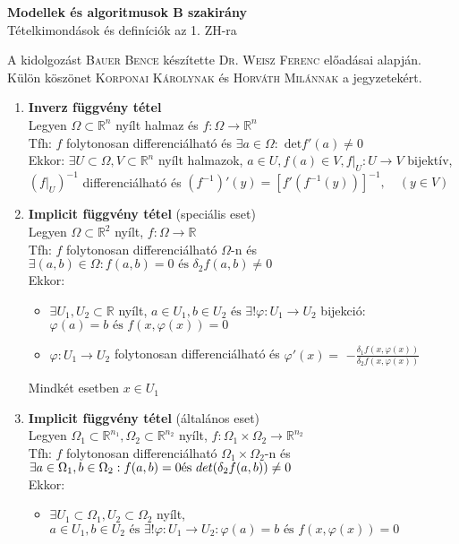 \documentclass{article}
\begin{document}
\renewcommand{\labelitemi}{\textbullet}
\def\R{\mathbb{R}}
\def\br{\\[0.1cm]}
\def\folytdifh{folytonosan differenciálható }
\begin{center}
	{\Large\textbf{Modellek és algoritmusok B szakirány}}\\[0.2cm]
	Tételkimondások és definíciók az 1. ZH-ra
\end{center}
{\small A kidolgozást \textsc{Bauer Bence} készítette \textsc{Dr. Weisz Ferenc} előadásai alapján.}\\
{\footnotesize Külön köszönet \textsc{Korponai Károlynak} és \textsc{Horváth Milánnak} a jegyzetekért.}

\begin{enumerate}
	\item\textbf{Inverz függvény tétel}\br
	Legyen $\Omega\subset\R^n$ nyílt halmaz és $f:\Omega\rightarrow\R^n$\br
	Tfh: $f$ \folytdifh és $\exists a\in\Omega:\text{ det}f'(a)\neq0$\br
	Ekkor: $\exists U\subset\Omega, V\subset\R^n$ nyílt halmazok, $a\in U, f(a)\in V,
	f|_U:U\rightarrow V$ bijektív,\br
	$(f|_U)^{-1}$ differenciálható és $(f^{-1})'(y)=[f'(f^{-1}(y))]^{-1},\quad (y\in V)$
	\item\textbf{Implicit függvény tétel} (speciális eset)\br
	Legyen $\Omega\subset\R^2$ nyílt, $f:\Omega\rightarrow\R$\br
	Tfh: $f$ folytonosan differenciálható $\Omega$-n és $\exists(a,b)\in\Omega:
	f(a,b)=0\text{ és }\delta_2f(a,b)\neq0$\br
	Ekkor:
	\begin{itemize}
		\item $\exists U_1, U_2\subset\R$ nyílt, $a\in U_1, b\in U_2\text{ és }\exists!\varphi:
		U_1\rightarrow U_2$ bijekció:$\varphi(a)=b\text{ és }f(x, \varphi(x))=0$
		\item $\varphi:U_1\rightarrow U_2$ \folytdifh és $\varphi'(x)=$
		\LARGE{$-\frac{\delta_1f(x, \varphi(x))}{\delta_2f(x, \varphi(x))}$}
	\end{itemize}
	Mindkét esetben $x\in U_1$
	\item\textbf{Implicit függvény tétel} (általános eset)\br
	Legyen $\Omega_1\subset\R^{n_1},\Omega_2\subset\R^{n_2}$ nyílt, 
	$f:\Omega_1\times\Omega_2\rightarrow\R^{n_2}$\br
	Tfh: $f$ \folytdifh $\Omega_1\times\Omega_2$-n és $\exists a\in\Omega_1, b\in\Omega_2:
	f(a,b)=0\br\text{és }det(\delta_2f(a,b))\neq0$\br
	Ekkor:
	\begin{itemize}
		\item $\exists U_1\subset\Omega_1, U_2\subset\Omega_2$ nyílt, $a\in U_1, b\in U_2\text{ és }\exists!\varphi:
		U_1\rightarrow U_2:\varphi(a)=b\text{ és }f(x, \varphi(x))=0$

\end{itemize}
\end{enumerate}
\end{document}
